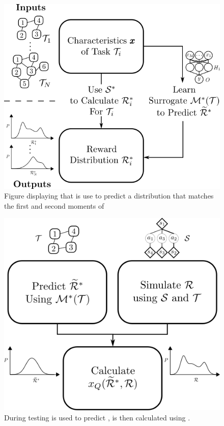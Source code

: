     \begin{figure}[tbp]
        \centering
        \includegraphics[width=0.7\linewidth]{Figures/SQ_train.png}
        \caption{Figure displaying that \surrogate{} is use to predict a distribution  \rwdstariapprox{} that matches the first and second moments of \rwdstari}
        \label{fig:sq_train}
    \end{figure}%

    \begin{figure}[tbp]
        \centering
        \includegraphics[width=0.6\linewidth]{Figures/SQ_test.png}
        \caption{During testing \surrogate{} is used to predict \rwdstarapprox{}, \xQ{} is then calculated using \rwd{}.}
        \label{fig:sq_train}
    \end{figure}
